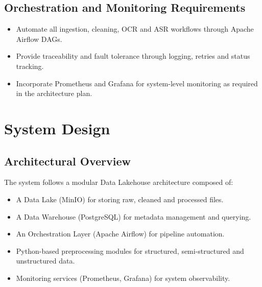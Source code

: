 \documentclass[12pt,oneside,openright,a4paper]{cpe-english-project}
\begin{document}
\subsection{Orchestration and Monitoring Requirements}
\begin{itemize}
\item Automate all ingestion, cleaning, OCR and ASR workflows through Apache Airflow DAGs.
\item Provide traceability and fault tolerance through logging, retries and status tracking.
\item Incorporate Prometheus and Grafana for system-level monitoring as required in the architecture plan.
\end{itemize}
\newpage
\section{System Design}

\subsection{Architectural Overview}
The system follows a modular Data Lakehouse architecture composed of:
\begin{itemize}
\item A Data Lake (MinIO) for storing raw, cleaned and processed files.
\item A Data Warehouse (PostgreSQL) for metadata management and querying.
\item An Orchestration Layer (Apache Airflow) for pipeline automation.
\item Python-based preprocessing modules for structured, semi-structured and unstructured data.
\item Monitoring services (Prometheus, Grafana) for system observability.
\end{itemize}
\end{document}
